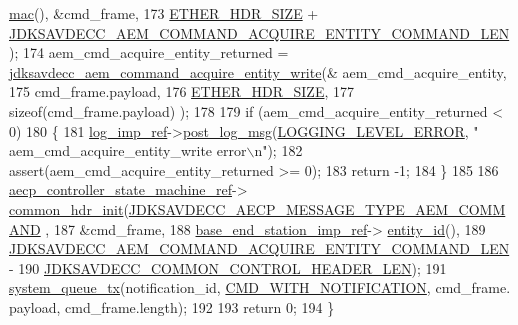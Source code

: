\begin{DoxyCode}
      \hyperlink{classavdecc__lib_1_1end__station__imp_a08e1bd1861b3b8f447ea374a65ac11f9}{mac}(), &cmd\_frame,
173                                                         \hyperlink{namespaceavdecc__lib_a6c827b1a0d973e18119c5e3da518e65ca9512ad9b34302ba7048d88197e0a2dc0}{ETHER\_HDR\_SIZE} + 
      \hyperlink{group__command__acquire__entity_gacd48c850101d4deef27e5c003f1c54cb}{JDKSAVDECC\_AEM\_COMMAND\_ACQUIRE\_ENTITY\_COMMAND\_LEN});
174     aem\_cmd\_acquire\_entity\_returned = 
      \hyperlink{group__command__acquire__entity_ga8f6285801e4769fe5ed789c57306f264}{jdksavdecc\_aem\_command\_acquire\_entity\_write}(&
      aem\_cmd\_acquire\_entity,
175                                                                                   cmd\_frame.payload,
176                                                                                   
      \hyperlink{namespaceavdecc__lib_a6c827b1a0d973e18119c5e3da518e65ca9512ad9b34302ba7048d88197e0a2dc0}{ETHER\_HDR\_SIZE},
177                                                                                   \textcolor{keyword}{sizeof}(cmd\_frame.payload)
      );
178 
179     \textcolor{keywordflow}{if} (aem\_cmd\_acquire\_entity\_returned < 0)
180     \{
181         \hyperlink{namespaceavdecc__lib_acbe3e2a96ae6524943ca532c87a28529}{log\_imp\_ref}->\hyperlink{classavdecc__lib_1_1log_a68139a6297697e4ccebf36ccfd02e44a}{post\_log\_msg}(\hyperlink{namespaceavdecc__lib_a501055c431e6872ef46f252ad13f85cdaf2c4481208273451a6f5c7bb9770ec8a}{LOGGING\_LEVEL\_ERROR}, \textcolor{stringliteral}{"
      aem\_cmd\_acquire\_entity\_write error\(\backslash\)n"});
182         assert(aem\_cmd\_acquire\_entity\_returned >= 0);
183         \textcolor{keywordflow}{return} -1;
184     \}
185 
186     \hyperlink{namespaceavdecc__lib_a0b1b5aea3c0490f77cbfd9178af5be22}{aecp\_controller\_state\_machine\_ref}->
      \hyperlink{classavdecc__lib_1_1aecp__controller__state__machine_aafc737d7ed17a62fed9df6528f18d3ec}{common\_hdr\_init}(\hyperlink{group__aecp__message__type_ga4625ce189cc209f42deb0629f48faf69}{JDKSAVDECC\_AECP\_MESSAGE\_TYPE\_AEM\_COMMAND}
      ,
187                                                        &cmd\_frame,
188                                                        \hyperlink{classavdecc__lib_1_1descriptor__base__imp_a550c969411f5f3b69f55cc139763d224}{base\_end\_station\_imp\_ref}->
      \hyperlink{classavdecc__lib_1_1end__station__imp_a363b6c9664a0d701def9b17863e20ad3}{entity\_id}(),
189                                                        
      \hyperlink{group__command__acquire__entity_gacd48c850101d4deef27e5c003f1c54cb}{JDKSAVDECC\_AEM\_COMMAND\_ACQUIRE\_ENTITY\_COMMAND\_LEN} -
190                                                            
      \hyperlink{group__jdksavdecc__avtp__common__control__header_gaae84052886fb1bb42f3bc5f85b741dff}{JDKSAVDECC\_COMMON\_CONTROL\_HEADER\_LEN});
191     \hyperlink{namespaceavdecc__lib_a6dd511685627c0865a3442b539a4e8e9}{system\_queue\_tx}(notification\_id, \hyperlink{namespaceavdecc__lib_aabcadff06aa62be0ce47bc0646823604aba48b8a017e06fb240b650cdea965178}{CMD\_WITH\_NOTIFICATION}, cmd\_frame.
      payload, cmd\_frame.length);
192 
193     \textcolor{keywordflow}{return} 0;
194 \}
\end{DoxyCode}


